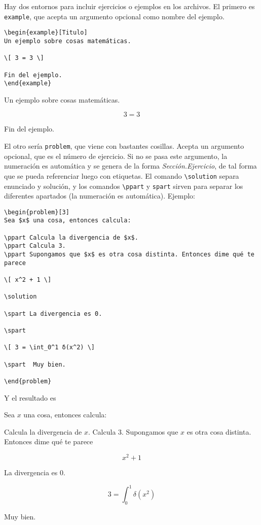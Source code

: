 \documentclass[nochap]{apuntes}
\begin{document}
Hay dos entornos para incluir ejercicios o ejemplos en los archivos. El primero es \texttt{example}, que acepta un argumento opcional como nombre del ejemplo.

\begin{verbatim}
\begin{example}[Titulo]
Un ejemplo sobre cosas matemáticas.

\[ 3 = 3 \]

Fin del ejemplo.
\end{example}
\end{verbatim}


\begin{example}[Titulo]
Un ejemplo sobre cosas matemáticas.

\[ 3 = 3 \]

Fin del ejemplo.
\end{example}

El otro sería \texttt{problem}, que viene con bastantes cosillas. Acepta un argumento opcional, que es el número de ejercicio. Si no se pasa este argumento, la numeración es automática y se genera de la forma \textit{Sección.Ejercicio}, de tal forma que se pueda referenciar luego con etiquetas. El comando \verb|\solution| separa enunciado y solución, y los comandos \verb|\ppart| y \verb|spart| sirven para separar los diferentes apartados (la numeración es automática). Ejemplo:

\begin{verbatim}
\begin{problem}[3]
Sea $x$ una cosa, entonces calcula:

\ppart Calcula la divergencia de $x$.
\ppart Calcula 3.
\ppart Supongamos que $x$ es otra cosa distinta. Entonces dime qué te parece

\[ x^2 + 1 \]

\solution

\spart La divergencia es 0.

\spart

\[ 3 = \int_0^1 δ(x^2) \]

\spart  Muy bien.

\end{problem}
\end{verbatim}

Y el resultado es

\begin{problem}[3]
Sea $x$ una cosa, entonces calcula:

\ppart Calcula la divergencia de $x$.
\ppart Calcula 3.
\ppart Supongamos que $x$ es otra cosa distinta. Entonces dime qué te parece

\[ x^2 + 1 \]

\solution

\spart La divergencia es 0.

\spart

\[ 3 = \int_0^1 δ(x^2) \]

\spart  Muy bien.

\end{problem}
\end{document}

